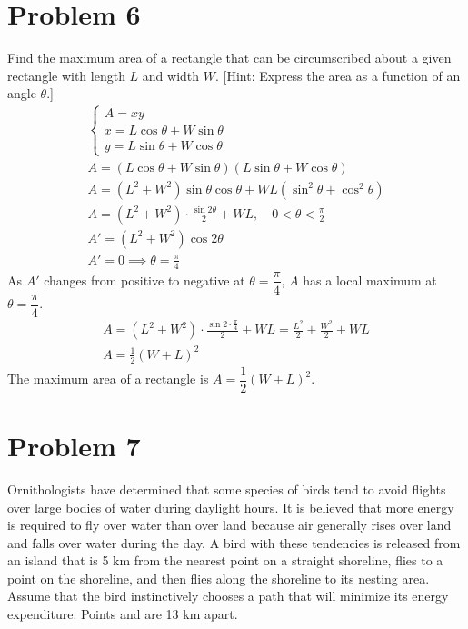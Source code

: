 \documentclass[12pt]{article}
\newcommand{\vem}{\vspace{0.5em}}
\newcommand{\problem}[1]{\section{Problem #1}}
\begin{document}
 \problem{6}
Find the maximum area of a rectangle that can be circumscribed about a given rectangle with length $L$
and width $W$. [Hint: Express the area as a function of an angle $\theta$.]
\begin{gather*}
    \begin{cases}
        A=xy\\
        x=L \cos \theta + W\sin \theta\\
        y=L\sin \theta + W\cos \theta
    \end{cases}\\
    A=(L\cos \theta +W\sin \theta )(L\sin \theta + W\cos \theta)\\
    A=(L^2+W^2)\sin \theta \cos \theta + WL (\sin^2\theta + \cos^2\theta)\\
    A=(L^2+W^2)\cdot \frac{\sin 2\theta}{2}+ WL, \quad 0<\theta<\frac{\pi}{2}\\
    A'=(L^2+W^2)\cos 2\theta\\
    A'=0 \implies \theta = \frac{\pi}{4}
\end{gather*}
As $A'$ changes from positive to negative at $\theta = \dfrac{\pi}{4}$, $A$ has a local maximum at $\theta = \dfrac{\pi}{4}$.
\begin{gather*}
    A=(L^2+W^2)\cdot \frac{\sin 2\cdot \frac{\pi}{4}}{2}+ WL=\frac{L^2}{2}+\frac{W^2}{2}+WL\\
    \boxed{A=\frac{1}{2}(W+L)^2}
\end{gather*}
The maximum area of a rectangle is $A=\dfrac{1}{2}(W+L)^2$.

\problem{7}
Ornithologists have determined that some species of birds tend to avoid flights over large bodies of water
during daylight hours. It is believed that more energy is required to fly over water than over land because
air generally rises over land and falls over water during the day. A bird with these tendencies is released
from an island that is 5 km from the nearest point on a straight shoreline, flies to a point on the shoreline,
and then flies along the shoreline to its nesting area. Assume that the bird instinctively chooses a path
that will minimize its energy expenditure. Points and are 13 km apart. \vem
\end{document}
